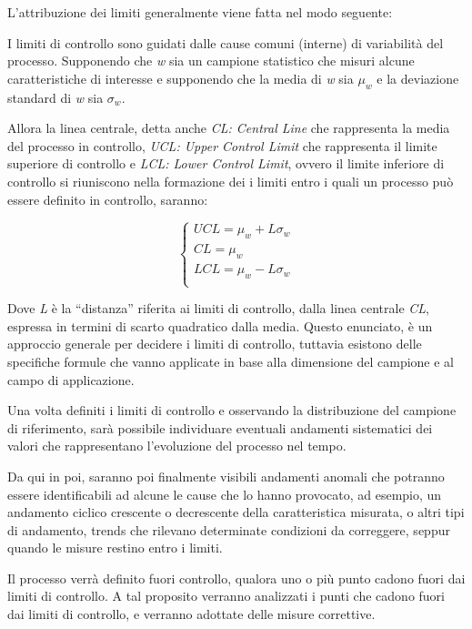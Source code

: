 L'attribuzione dei limiti generalmente viene fatta nel modo seguente:

I limiti di controllo sono guidati dalle cause comuni (interne) di variabilità del processo. 
Supponendo che \textit{w} sia un campione statistico che misuri alcune caratteristiche di interesse e supponendo che la media di \textit{w} sia $\mathit{\mu_w}$ e la deviazione standard di \textit{w} sia $\mathit{\sigma_w}$. 

Allora la linea centrale, detta anche \textit{CL: Central Line} che rappresenta la media del processo in controllo, \textit{UCL: Upper Control Limit} che rappresenta il limite superiore di controllo e \textit{LCL: Lower Control Limit}, ovvero il limite inferiore di controllo
si riuniscono nella formazione dei i limiti entro i quali un processo può essere definito in controllo, saranno:


\begin{equation}
  \begin{cases}
  UCL = \mu_w + L\sigma_w\\
  CL = \mu_w\\
  LCL = \mu_w - L\sigma_w \\
\end{cases}
\label {eqn: CONTROL LIMITS}
\end{equation}


Dove \textit{L} è la ``distanza'' riferita ai limiti di controllo, dalla linea centrale \textit{CL}, espressa in termini di scarto quadratico dalla media.
Questo enunciato, è un approccio generale per decidere i limiti di controllo, tuttavia esistono delle specifiche formule che vanno applicate in base alla dimensione del campione e al campo di applicazione.

Una volta definiti i limiti di controllo e osservando la distribuzione del campione di riferimento, sarà possibile individuare eventuali andamenti sistematici dei valori che rappresentano l'evoluzione del processo nel tempo. 

Da qui in poi, saranno poi finalmente visibili andamenti anomali che potranno essere identificabili ad alcune le cause che lo hanno provocato, ad esempio, un andamento ciclico crescente o decrescente della caratteristica misurata, o altri tipi di andamento, trends che rilevano determinate condizioni da correggere, seppur quando le misure restino entro i limiti.

Il processo verrà definito fuori controllo, qualora uno o più punto cadono fuori dai limiti di controllo. 
A tal proposito verranno analizzati i punti che cadono fuori dai limiti di controllo, e verranno adottate delle misure correttive. 
\cite{montgomery2009statistical}


